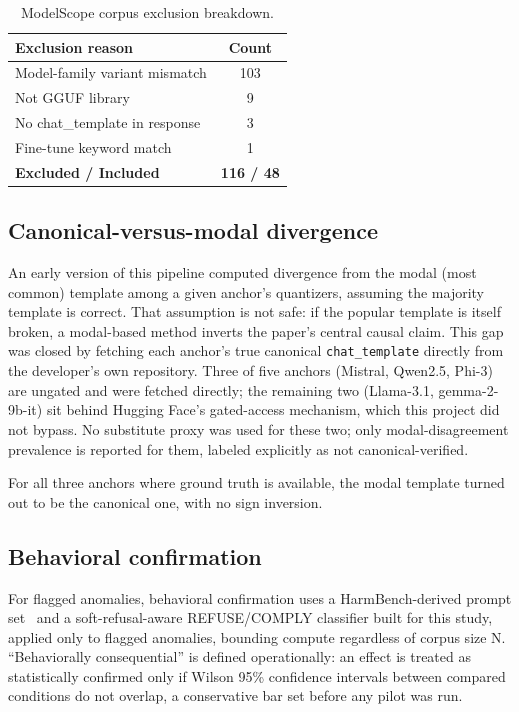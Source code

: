 \documentclass[letterpaper,twocolumn,10pt]{article}
\begin{document}
\begin{table}[t]
\caption{ModelScope corpus exclusion breakdown.}
\label{tab:modelscope-exclusions}
\centering
\small
\begin{tabular}{lc}
\toprule
Exclusion reason & Count \\
\midrule
Model-family variant mismatch & 103 \\
Not GGUF library & 9 \\
No chat\_template in response & 3 \\
Fine-tune keyword match & 1 \\
\midrule
\textbf{Excluded / Included} & \textbf{116 / 48} \\
\bottomrule
\end{tabular}
\end{table}

\subsection{Canonical-versus-modal divergence}

An early version of this pipeline computed divergence from the modal (most common) template among a given anchor's quantizers, assuming the majority template is correct. That assumption is not safe: if the popular template is itself broken, a modal-based method inverts the paper's central causal claim. This gap was closed by fetching each anchor's true canonical \texttt{chat\_template} directly from the developer's own repository. Three of five anchors (Mistral, Qwen2.5, Phi-3) are ungated and were fetched directly; the remaining two (Llama-3.1, gemma-2-9b-it) sit behind Hugging Face's gated-access mechanism, which this project did not bypass. No substitute proxy was used for these two; only modal-disagreement prevalence is reported for them, labeled explicitly as not canonical-verified.

For all three anchors where ground truth is available, the modal template turned out to be the canonical one, with no sign inversion.

\subsection{Behavioral confirmation}

For flagged anomalies, behavioral confirmation uses a HarmBench-derived prompt set~\cite{mazeika2024harmbench} and a soft-refusal-aware REFUSE/COMPLY classifier built for this study, applied only to flagged anomalies, bounding compute regardless of corpus size N. ``Behaviorally consequential'' is defined operationally: an effect is treated as statistically confirmed only if Wilson 95\% confidence intervals between compared conditions do not overlap, a conservative bar set before any pilot was run.
\end{document}
